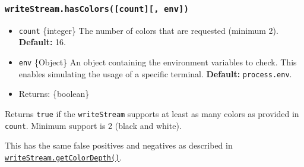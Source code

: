 \subsubsection{\texorpdfstring{\texttt{writeStream.hasColors({[}count{]}{[},\ env{]})}}{writeStream.hasColors({[}count{]}{[}, env{]})}}\label{writestream.hascolorscount-env}

\begin{itemize}
\tightlist
\item
  \texttt{count} \{integer\} The number of colors that are requested
  (minimum 2). \textbf{Default:} 16.
\item
  \texttt{env} \{Object\} An object containing the environment variables
  to check. This enables simulating the usage of a specific terminal.
  \textbf{Default:} \texttt{process.env}.
\item
  Returns: \{boolean\}
\end{itemize}

Returns \texttt{true} if the \texttt{writeStream} supports at least as
many colors as provided in \texttt{count}. Minimum support is 2 (black
and white).

This has the same false positives and negatives as described in
\hyperref[writestreamgetcolordepthenv]{\texttt{writeStream.getColorDepth()}}.

\begin{Shaded}
\begin{Highlighting}[]
\NormalTok{()}\OperatorTok{;}
\NormalTok{(}\NormalTok{)}\OperatorTok{;}
\NormalTok{(\{ }\OperatorTok{:} \StringTok{\textquotesingle{}1\textquotesingle{}}\NormalTok{ \})}\OperatorTok{;}
\NormalTok{(} \OperatorTok{**} \OperatorTok{,}\NormalTok{ \{ }\OperatorTok{:} \StringTok{\textquotesingle{}1\textquotesingle{}}\NormalTok{ \})}\OperatorTok{;}
\end{Highlighting}
\end{Shaded}

